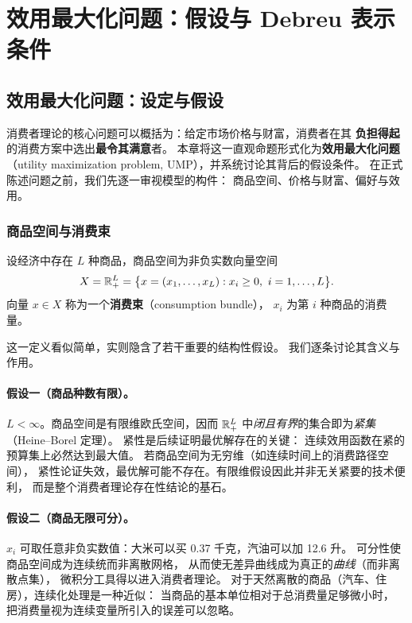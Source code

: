 \section{效用最大化问题：假设与 Debreu 表示条件}

\subsection{效用最大化问题：设定与假设}
\label{sec:ump-assumptions}

消费者理论的核心问题可以概括为：给定市场价格与财富，消费者在其
\textbf{负担得起}的消费方案中选出\textbf{最令其满意}者。
本章将这一直观命题形式化为\textbf{效用最大化问题}
（utility maximization problem, UMP），并系统讨论其背后的假设条件。
在正式陈述问题之前，我们先逐一审视模型的构件：
商品空间、价格与财富、偏好与效用。

\subsubsection{商品空间与消费束}
\label{subsec:commodity-space}

\begin{definition}[商品空间与消费束]\label{def:consumption-bundle}
设经济中存在 $L$ 种商品，商品空间为非负实数向量空间
\[
  X=\R^L_+=\bigl\{x=(x_1,\dots,x_L): x_i\geq 0,\ i=1,\dots,L\bigr\}.
\]
向量 $x\in X$ 称为一个\textbf{消费束}（consumption bundle），
$x_i$ 为第 $i$ 种商品的消费量。
\end{definition}

这一定义看似简单，实则隐含了若干重要的结构性假设。
我们逐条讨论其含义与作用。

\paragraph{假设一（商品种数有限）。}
$L<\infty$。商品空间是有限维欧氏空间，因而
$\mathbb{R}^L_+$ 中\emph{闭且有界}的集合即为\emph{紧集}（Heine--Borel 定理）。
紧性是后续证明最优解存在的关键：
连续效用函数在紧的预算集上必然达到最大值。
若商品空间为无穷维（如连续时间上的消费路径空间），
紧性论证失效，最优解可能不存在。有限维假设因此并非无关紧要的技术便利，
而是整个消费者理论存在性结论的基石。

\paragraph{假设二（商品无限可分）。}
$x_i$ 可取任意非负实数值：大米可以买 0.37 千克，汽油可以加 12.6 升。
可分性使商品空间成为连续统而非离散网格，
从而使无差异曲线成为真正的\emph{曲线}（而非离散点集），
微积分工具得以进入消费者理论。
对于天然离散的商品（汽车、住房），连续化处理是一种近似：
当商品的基本单位相对于总消费量足够微小时，
把消费量视为连续变量所引入的误差可以忽略。

